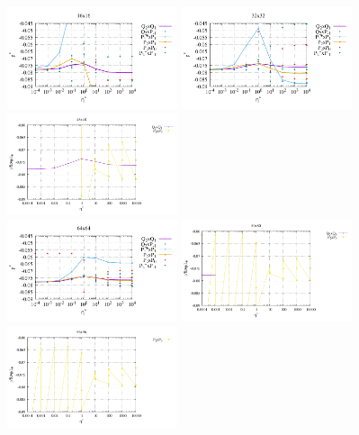 \begin{center}
\includegraphics[width=5cm]{python_codes/fieldstone_120/paperresults/sinker_reduced/structured/sinker_reduced_press_16}
\includegraphics[width=5cm]{python_codes/fieldstone_120/paperresults/sinker_reduced/structured/sinker_reduced_press_32}
\includegraphics[width=5cm]{python_codes/fieldstone_120/paperresults/sinker_reduced/structured/sinker_reduced_press_48}\\
\includegraphics[width=5cm]{python_codes/fieldstone_120/paperresults/sinker_reduced/structured/sinker_reduced_press_64}
\includegraphics[width=5cm]{python_codes/fieldstone_120/paperresults/sinker_reduced/structured/sinker_reduced_press_80}
\includegraphics[width=5cm]{python_codes/fieldstone_120/paperresults/sinker_reduced/structured/sinker_reduced_press_96}
\end{center}




